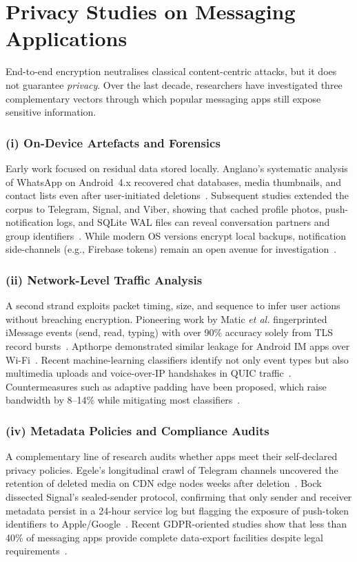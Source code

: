 \documentclass[a4paper,12pt]{report}
\begin{document}
\section{Privacy Studies on Messaging Applications}
\label{sec:rw:privacy-im}

End-to-end encryption neutralises classical content-centric attacks, but it does not guarantee \emph{privacy}. Over the last decade, researchers have investigated three complementary vectors through which popular messaging apps still expose sensitive information.

\subsubsection*{(i) On-Device Artefacts and Forensics}
Early work focused on residual data stored locally. Anglano’s systematic analysis of WhatsApp on Android~4.x recovered chat databases, media thumbnails, and contact lists even after user-initiated deletions~\cite{anglano2015whatsapp}. Subsequent studies extended the corpus to Telegram, Signal, and Viber, showing that cached profile photos, push-notification logs, and SQLite WAL files can reveal conversation partners and group identifiers~\cite{moltchanov2018telegram, obermeier2018signal}. While modern OS versions encrypt local backups, notification side-channels (e.g., Firebase tokens) remain an open avenue for investigation~\cite{berezowski2020push}.

\subsubsection*{(ii) Network-Level Traffic Analysis}
A second strand exploits packet timing, size, and sequence to infer user actions without breaching encryption. Pioneering work by Matic \emph{et al.} fingerprinted iMessage events (send, read, typing) with over 90\% accuracy solely from TLS record bursts~\cite{matic2015iMessage}. Apthorpe demonstrated similar leakage for Android IM apps over Wi-Fi~\cite{apthorpe2018smart}. Recent machine-learning classifiers identify not only event types but also multimedia uploads and voice-over-IP handshakes in QUIC traffic~\cite{lee2023quic}. Countermeasures such as adaptive padding have been proposed, which raise bandwidth by 8–14\% while mitigating most classifiers~\cite{poblete2021defence}.

\subsubsection*{(iv) Metadata Policies and Compliance Audits}
A complementary line of research audits whether apps meet their self-declared privacy policies. Egele’s longitudinal crawl of Telegram channels uncovered the retention of deleted media on CDN edge nodes weeks after deletion~\cite{egele2019cdn}. Bock dissected Signal’s sealed-sender protocol, confirming that only sender and receiver metadata persist in a 24-hour service log but flagging the exposure of push-token identifiers to Apple/Google~\cite{bock2020sealed}. Recent GDPR-oriented studies show that less than 40\% of messaging apps provide complete data-export facilities despite legal requirements~\cite{frolov2022gdpr}.
\end{document}
